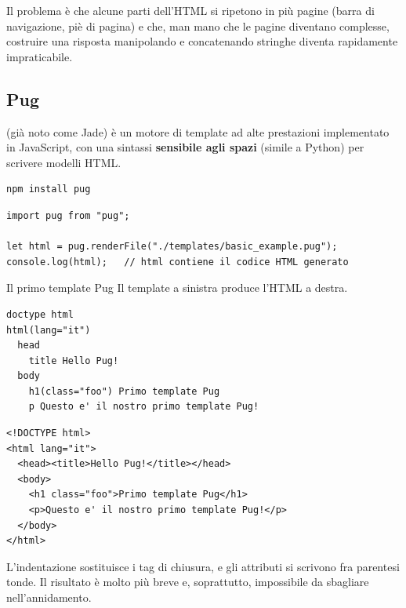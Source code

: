 Il problema è che alcune parti dell'HTML si ripetono in più pagine (barra di
navigazione, piè di pagina) e che, man mano che le pagine diventano complesse,
costruire una risposta manipolando e concatenando stringhe diventa rapidamente
impraticabile.


\subsection{Pug}

 (già noto come Jade) è un motore di template ad alte prestazioni
implementato in JavaScript, con una sintassi \textbf{sensibile agli spazi}
(simile a Python) per scrivere modelli HTML.

\begin{lstlisting}[style=shell]
npm install pug
\end{lstlisting}

\begin{lstlisting}[style=js]
import pug from "pug";

let html = pug.renderFile("./templates/basic_example.pug");
console.log(html);   // html contiene il codice HTML generato
\end{lstlisting}

\begin{esempio}{Il primo template Pug}
Il template a sinistra produce l'HTML a destra.

\begin{affianco}[0.45]
\begin{lstlisting}[style=pug, name=basic_example.pug]
doctype html
html(lang="it")
  head
    title Hello Pug!
  body
    h1(class="foo") Primo template Pug
    p Questo e' il nostro primo template Pug!
\end{lstlisting}
\risultato
\begin{lstlisting}[style=html, name=output.html]
<!DOCTYPE html>
<html lang="it">
  <head><title>Hello Pug!</title></head>
  <body>
    <h1 class="foo">Primo template Pug</h1>
    <p>Questo e' il nostro primo template Pug!</p>
  </body>
</html>
\end{lstlisting}
\end{affianco}

L'indentazione sostituisce i tag di chiusura, e gli attributi si scrivono fra
parentesi tonde. Il risultato è molto più breve e, soprattutto, impossibile da
sbagliare nell'annidamento.
\end{esempio}

